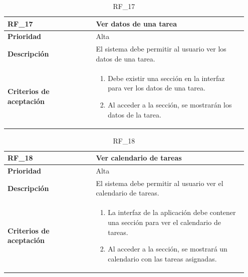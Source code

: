 \begin{table}[htb!]
    \begin{tabular}{|p{0.35\linewidth}|p{0.6\linewidth}|}
        \hline
        \rowcolor[HTML]{C0C0C0}  
        \textbf{RF\_17} & \textbf{Ver datos de una tarea} \\
        \hline
        \textbf{Prioridad} & Alta \\
        \hline
        \textbf{Descripción} & El sistema debe permitir al usuario ver los datos de una tarea.  \\
        \hline
        \vspace{0.5mm}
        \textbf{Criterios de aceptación} & 
        \begin{minipage}[t]{0.9\linewidth}
            \begin{enumerate}
                \item Debe existir una sección en la interfaz para ver los datos de una tarea.
                \item Al acceder a la sección, se mostrarán los datos de la tarea.
            \end{enumerate}
            \vspace{2mm}
        \end{minipage} \\
        \hline
    \end{tabular}
    \caption{RF\_17}
    \label{req:RF17}
\end{table}

\begin{table}[htb!]
    \begin{tabular}{|p{0.35\linewidth}|p{0.6\linewidth}|}
        \hline
        \rowcolor[HTML]{C0C0C0}  
        \textbf{RF\_18} & \textbf{Ver calendario de tareas} \\
        \hline
        \textbf{Prioridad} & Alta \\
        \hline
        \textbf{Descripción} & El sistema debe permitir al usuario ver el calendario de tareas.  \\
        \hline
        \vspace{0.5mm}
        \textbf{Criterios de aceptación} & 
        \begin{minipage}[t]{0.9\linewidth}
            \begin{enumerate}
                \item La interfaz de la aplicación debe contener una sección para ver el calendario de tareas.
                \item Al acceder a la sección, se mostrará un calendario con las tareas asignadas.
            \end{enumerate}
            \vspace{2mm}
        \end{minipage} \\
        \hline
    \end{tabular}
    \caption{RF\_18}
    \label{req:RF18}
\end{table}



